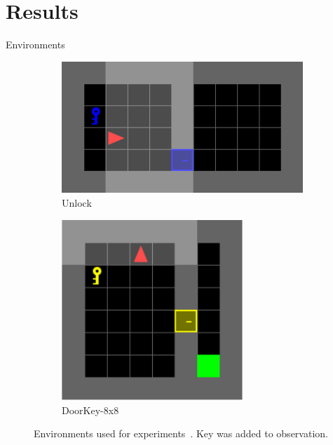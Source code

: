 \documentclass[aspectratio=169]{beamer}
\begin{document}
\section{Results}
\begin{frame}{Environments}
  \begin{figure}
    \begin{subfigure}{0.48\textwidth}
      \centering
      \includegraphics[width=\textwidth, height=\textheight, keepaspectratio]{./images/unlock-v0.png}
      \caption{Unlock}
    \end{subfigure}
    \begin{subfigure}{0.48\textwidth}
      \centering
      \includegraphics[width=0.75\textwidth, height=\textheight, keepaspectratio]{./images/doorkey-8x8-v0.png}
      \caption{DoorKey-8x8}
    \end{subfigure}
    \caption{Environments used for experiments~\cite{minigrid}. Key was added to observation.}
  \end{figure}
\end{frame}
\end{document}
